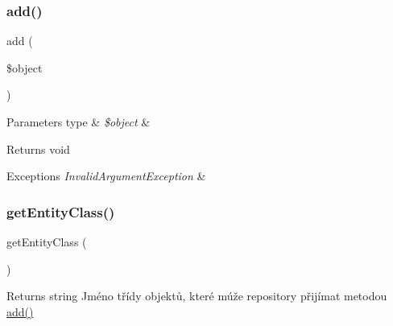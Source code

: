 \subsubsection{\texorpdfstring{add()}{add()}}
{\footnotesize\ttfamily add (\begin{DoxyParamCaption}\item[{}]{\$object }\end{DoxyParamCaption})}


\begin{DoxyParams}[1]{Parameters}
type & {\em \$object} & \\
\hline
\end{DoxyParams}
\begin{DoxyReturn}{Returns}
void 
\end{DoxyReturn}

\begin{DoxyExceptions}{Exceptions}
{\em Invalid\+Argument\+Exception} & \\
\hline
\end{DoxyExceptions}
\mbox{\label{class_framework_1_1_model_1_1_repository_a82bf7d9129d40bb5d953f2b08210fccc}} 
\subsubsection{\texorpdfstring{get\+Entity\+Class()}{getEntityClass()}}
{\footnotesize\ttfamily get\+Entity\+Class (\begin{DoxyParamCaption}{ }\end{DoxyParamCaption})\hspace{0.3cm}{\ttfamily [abstract]}}

\begin{DoxyReturn}{Returns}
string Jméno třídy objektů, které múže repository přijímat metodou \mbox{\hyperlink{class_framework_1_1_model_1_1_repository_a28c225013feb765170e788e9f060b54f}{add()}} 
\end{DoxyReturn}
\mbox{\label{class_framework_1_1_model_1_1_repository_a9ba1bf42939522398e98e21b528ad72b}} 
